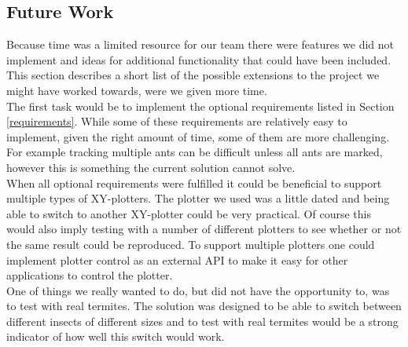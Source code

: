 
\subsection{Future Work}

Because time was a limited resource for our team there were features we did not implement and ideas for additional functionality that could have been included. This section describes a short list of the possible extensions to the project we might have worked towards, were we given more time. \\

The first task would be to implement the optional requirements listed in Section \ref{requirements}. While some of these requirements are relatively easy to implement, given the right amount of time, some of them are more challenging. For example tracking multiple ants can be difficult unless all ants are marked, however this is something the current solution cannot solve. \\

When all optional requirements were fulfilled it could be beneficial to support multiple types of XY-plotters. The plotter we used was a little dated and being able to switch to another XY-plotter could be very practical. Of course this would also imply testing with a number of different plotters to see whether or not the same result could be reproduced. To support multiple plotters one could implement plotter control as an external API to make it easy for other applications to control the plotter. \\

One of things we really wanted to do, but did not have the opportunity to, was to test with real termites. The solution was designed to be able to switch between different insects of different sizes and to test with real termites would be a strong indicator of how well this switch would work. \\